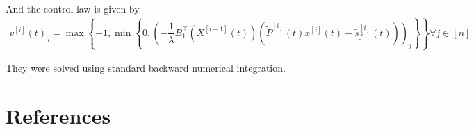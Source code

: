\documentclass[3p,times]{elsarticle}
\begin{document}
And the control law is given by
\begin{align}
v^{[i]}(t)_j = \max \left\{ -1,\min\left\{0,\left( -\dfrac{1}{\lambda}B_1^\top\left(X^{[i-1]}(t)\right)\left(\tilde{P}^{[i]}(t)x^{[i]}(t)-\tilde{s}_f^{[i]}(t)\right)\right)_j \right\}\right\} \forall j \in [n]
\end{align} 

They were solved using standard backward numerical integration.
\section{References}


\end{document}
